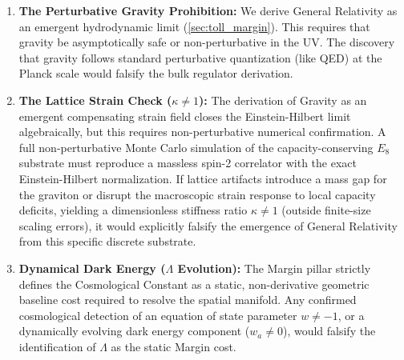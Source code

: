 \begin{enumerate}
    \item \textbf{The Perturbative Gravity Prohibition:} We derive General Relativity as an emergent hydrodynamic limit (\cref{sec:toll_margin}). This requires that gravity be asymptotically safe or non-perturbative in the UV. The discovery that gravity follows standard perturbative quantization (like QED) at the Planck scale would falsify the bulk regulator derivation.

    \item \textbf{The Lattice Strain Check ($\kappa \neq 1$):} The derivation of Gravity as an emergent compensating strain field closes the Einstein-Hilbert limit algebraically, but this requires non-perturbative numerical confirmation. A full non-perturbative Monte Carlo simulation of the capacity-conserving $E_8$ substrate must reproduce a massless spin-2 correlator with the exact Einstein-Hilbert normalization. If lattice artifacts introduce a mass gap for the graviton or disrupt the macroscopic strain response to local capacity deficits, yielding a dimensionless stiffness ratio $\kappa \neq 1$ (outside finite-size scaling errors), it would explicitly falsify the emergence of General Relativity from this specific discrete substrate.

    \item \textbf{Dynamical Dark Energy ($\Lambda$ Evolution):} The Margin pillar strictly defines the Cosmological Constant as a static, non-derivative geometric baseline cost required to resolve the spatial manifold. Any confirmed cosmological detection of an equation of state parameter $w \neq -1$, or a dynamically evolving dark energy component ($w_a \neq 0$), would falsify the identification of $\Lambda$ as the static Margin cost.
\end{enumerate}